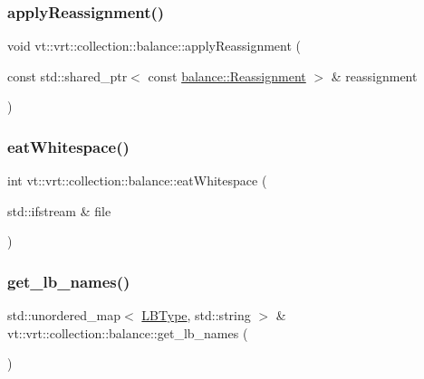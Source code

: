 \subsubsection{\texorpdfstring{apply\+Reassignment()}{applyReassignment()}}
{\footnotesize\ttfamily void vt\+::vrt\+::collection\+::balance\+::apply\+Reassignment (\begin{DoxyParamCaption}\item[{const std\+::shared\+\_\+ptr$<$ const \hyperlink{structvt_1_1vrt_1_1collection_1_1balance_1_1_reassignment}{balance\+::\+Reassignment} $>$ \&}]{reassignment }\end{DoxyParamCaption})}

\mbox{\label{namespacevt_1_1vrt_1_1collection_1_1balance_a605ea184edf7f99b0022f960f71bf4d4}} 
\subsubsection{\texorpdfstring{eat\+Whitespace()}{eatWhitespace()}}
{\footnotesize\ttfamily int vt\+::vrt\+::collection\+::balance\+::eat\+Whitespace (\begin{DoxyParamCaption}\item[{std\+::ifstream \&}]{file }\end{DoxyParamCaption})}

\mbox{\label{namespacevt_1_1vrt_1_1collection_1_1balance_ab24424d5cc677e1c6dfe67d5e03efc70}} 
\subsubsection{\texorpdfstring{get\+\_\+lb\+\_\+names()}{get\_lb\_names()}}
{\footnotesize\ttfamily std\+::unordered\+\_\+map$<$ \hyperlink{namespacevt_1_1vrt_1_1collection_1_1balance_ac4f99693509affcc67db182d4aad9b5c}{L\+B\+Type}, std\+::string $>$ \& vt\+::vrt\+::collection\+::balance\+::get\+\_\+lb\+\_\+names (\begin{DoxyParamCaption}{ }\end{DoxyParamCaption})}

